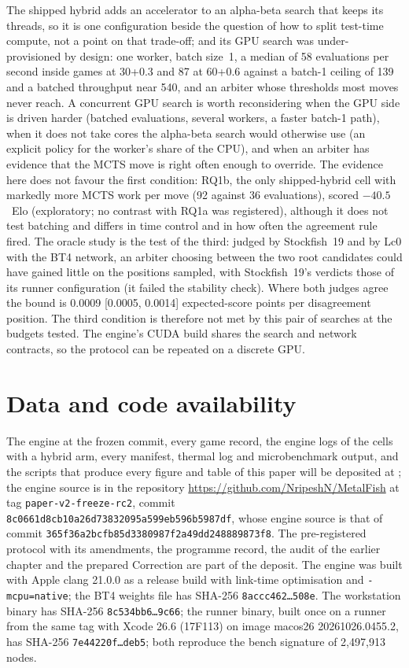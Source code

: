 \documentclass{article}
\newif\iffinal
\newif\ifanon
\newcommand{\depositcite}{\ifanon\cite{anonarchive}\else\cite{zenodo}\fi}
\newcommand{\pending}[1]{\iffinal\PackageError{paper}{Pending content: #1}{Fill it from the artifact before the final build.}\else\textcolor{red}{[PENDING: #1]}\fi}
\begin{document}
The shipped hybrid adds an accelerator to an alpha-beta search that keeps its threads, so it is one configuration beside the question of how to split test-time compute, not a point on that trade-off; and its GPU search was under-provisioned by design: one worker, batch size~1, a median of 58 evaluations per second inside games at 30+0.3 and 87 at 60+0.6 against a batch-1 ceiling of 139 and a batched throughput near 540, and an arbiter whose thresholds most moves never reach. A concurrent GPU search is worth reconsidering when the GPU side is driven harder (batched evaluations, several workers, a faster batch-1 path), when it does not take cores the alpha-beta search would otherwise use (an explicit policy for the worker's share of the CPU), and when an arbiter has evidence that the MCTS move is right often enough to override. The evidence here does not favour the first condition: RQ1b, the only shipped-hybrid cell with markedly more MCTS work per move (92 against 36 evaluations), scored $-40.5$~Elo (exploratory; no contrast with RQ1a was registered), although it does not test batching and differs in time control and in how often the agreement rule fired. The oracle study is the test of the third: judged by Stockfish~19 and by Lc0 with the BT4 network, an arbiter choosing between the two root candidates could have gained little on the positions sampled, with Stockfish~19's verdicts those of its runner configuration (it failed the stability check). Where both judges agree the bound is 0.0009 [0.0005, 0.0014] expected-score points per disagreement position. The third condition is therefore not met by this pair of searches at the budgets tested. The engine's CUDA build shares the search and network contracts, so the protocol can be repeated on a discrete GPU.

\section*{Data and code availability}
The engine at the frozen commit, every game record, the engine logs of the cells with a hybrid arm, every manifest, thermal log and microbenchmark output, and the scripts that produce every figure and table of this paper \iffinal are\else will be\fi{} deposited at \ifanon an anonymised archive whose link is supplied to the editors~\depositcite{}\else{}; the engine source is in the repository \url{https://github.com/NripeshN/MetalFish} at tag \texttt{paper-v2-freeze-rc2}, commit \texttt{8c0661d8cb10a26d73832095a599eb596b5987df}, whose engine source is that of commit \texttt{365f36a2bcfb85d3380987f2a49dd248889873f8}\fi. The pre-registered protocol with its amendments, the programme record\ifanon{} and the audit of the earlier chapter are\else, the audit of the earlier chapter and the prepared Correction are\fi{} part of the deposit. The engine was built with Apple clang 21.0.0 as a release build with link-time optimisation and \texttt{-mcpu=native}; the BT4 weights file has SHA-256 \texttt{8accc462\ldots{}508e}. The workstation binary has SHA-256 \texttt{8c534bb6\ldots{}9c66}; the runner binary, built once on a runner from the same tag with Xcode 26.6 (17F113) on image macos26 20261026.0455.2, has SHA-256 \texttt{7e44220f\ldots{}deb5}; both reproduce the bench signature of 2{,}497{,}913 nodes.
\end{document}

